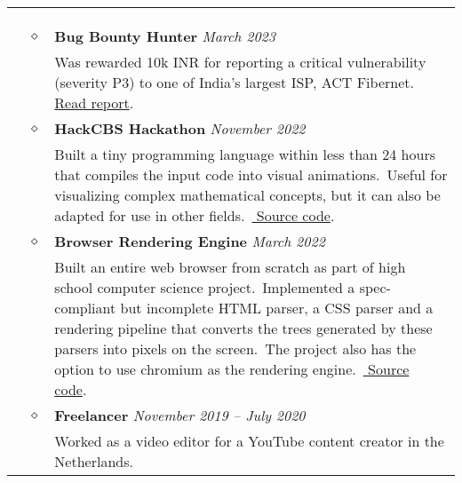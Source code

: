 \documentclass[11pt]{article}
\begin{document}
    \noindent
    \begin{tabularx}{\textwidth}{@{}b{90px} b{9px}@{} X@{}}
        \iftoggle{lines}{\\ \\ \hline \\}{}

        \lettrine[lines=1,loversize=-0.5]{E}XPERIENCE & $\diamond$ &

        \textbf{Bug Bounty Hunter} \hfill \textit{March 2023} \\ & &
        Was rewarded 10k INR for reporting a critical vulnerability (severity P3) to one of India's largest ISP, ACT
        Fibernet.\ \href{https://files.sujal.dev/act/report.pdf}{\color{blue} Read report}.\

        \\ & $\diamond$ &

        \textbf{HackCBS Hackathon} \hfill \textit{November 2022} \\ & &
        Built a tiny programming language within less than 24 hours that compiles the input code into visual
        animations.\ Useful for visualizing complex mathematical concepts, but it can also be adapted for use in
        other fields.\ \href{https://github.com/sujaldev/lyn}{\color{blue} Source code}.\

        \\ & $\diamond$ &

        \textbf{Browser Rendering Engine} \hfill \textit{March 2022} \\ & &
        Built an entire web browser from scratch as part of high school computer science project.\ Implemented a
        spec-compliant but incomplete HTML parser, a CSS parser and a rendering pipeline that converts the trees
        generated by these parsers into pixels on the screen.\ The project also has the option to use chromium as the
        rendering engine.\ \href{https://github.com/sujaldev/skylon}{\color{blue} Source code}.\

        \\ & $\diamond$ &

        \textbf{Freelancer} \hfill \textit{November 2019 -- July 2020} \\ & &
        Worked as a video editor for a YouTube content creator in the Netherlands.


\end{tabularx}
\end{document}
